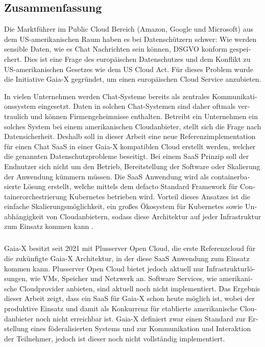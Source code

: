 \begin{otherlanguage}{ngerman}
	\chapter*{Zusammenfassung}

	Die Marktführer im Public Cloud Bereich (Amazon, Google und Microsoft) aus dem US-amerikanischen Raum
	haben es bei Datenschützern schwer:
	Wie werden sensible Daten, wie es Chat Nachrichten sein können, DSGVO konform gespeichert.
	Dies ist eine Frage des europäischen Datenschutzes und dem Konflikt zu US-amerikanischen Gesetzes wie dem US Cloud Act.
	Für dieses Problem wurde die Initiative Gaia-X gegründet, um einen europäischen Cloud Service anzubieten.

	In vielen Unternehmen werden Chat-Systeme bereits als zentrales Kommunikationssystem eingesetzt.
	Daten in solchen Chat-Systemen sind daher oftmals vertraulich und können Firmengeheimnisse enthalten.
	Betreibt ein Unternehmen ein solches System bei einem amerikanischen Cloudanbieter, stellt sich die Frage nach Datensicherheit.
	Deshalb soll in dieser Arbeit eine neue Referenzimplementation für einen Chat \acf{SaaS} in einer Gaia-X kompatiblen Cloud erstellt werden,
	welcher die genannten Datenschutzprobleme beseitigt.
	Bei einem \ac{SaaS} Prinzip soll der Endnutzer sich nicht um den Betrieb, Bereitstellung der Software
	oder Skalierung der Anwendung kümmern müssen. 
	Die \ac{SaaS} Anwendung wird als containerbasierte Lösung erstellt, welche mittels dem defacto Standard Framework für 
	Containerorchestrierung Kubernetes \cite{Burns2019} betrieben wird. Vorteil dieses Ansatzes ist die einfache Skalierungsmöglichkeit,
	ein großes Ökosystem für Kubernetes sowie Unabhängigkeit von Cloudanbietern, 
	sodass diese Architektur auf jeder Infrastruktur zum Einsatz kommen kann \cite{Burns2019}.
	\paragraph{}
	Gaia-X besitzt seit 2021 mit Plusserver Open Cloud, die erste Referenzcloud für die zukünfigte Gaia-X Architektur,
	in der diese \ac{SaaS} Anwendung zum Einsatz kommen kann.	
	Plusserver Open Cloud bietet jedoch aktuell nur Infrastrukturlösungen, wie \acp{VM}, Speicher und Netzwerk an. 
	Software Services, wie amerikanische Cloudprovider anbieten, sind aktuell noch nicht implementiert.
	Das Ergebnis dieser Arbeit zeigt, dass ein \ac{SaaS} für Gaia-X schon heute möglich ist, 
	wobei der produktive Einsatz und damit als Konkurrenz für etablierte amerikanische Cloudanbieter noch nicht erreichbar ist. 
	Gaia-X definiert zwar einen Standard zur Erstellung eines föderalisierten Systems und zur Kommunikation und Interaktion 
	der Teilnehmer, jedoch ist dieser noch nicht vollständig implementiert. 

\end{otherlanguage}